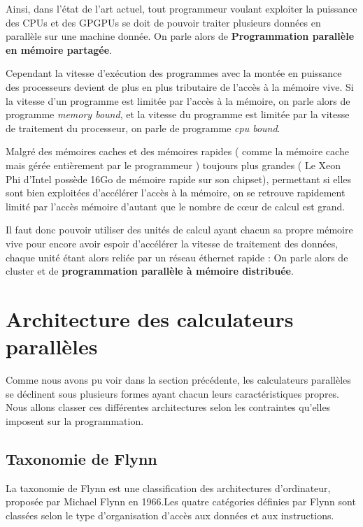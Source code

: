 \documentclass[fleqn,11pt]{article}
\begin{document}
Ainsi, dans l'état de l'art actuel, tout programmeur voulant exploiter la puissance des CPUs et des GPGPUs se doit de pouvoir traiter plusieurs données en parallèle sur une machine donnée. On parle alors de \textbf{Programmation parallèle en mémoire partagée}.

Cependant la vitesse d'exécution des programmes avec la montée en puissance des processeurs devient de plus en plus tributaire de l'accès à la mémoire vive. Si la vitesse d'un programme est limitée par l'accès à la mémoire,  on parle alors de programme \textsl{memory bound}, et la vitesse du programme est limitée par la vitesse de traitement du processeur, on parle de programme \textsl{cpu bound}.

Malgré des mémoires caches et des mémoires rapides ( comme la mémoire cache mais gérée entièrement par le programmeur )  toujours plus grandes ( Le Xeon Phi d'Intel possède 16Go de mémoire rapide sur son chipset), permettant si elles sont bien exploitées d'accélérer l'accès à la mémoire, on se retrouve rapidement limité par l'accès mémoire d'autant que le nombre de cœur de calcul est grand.

Il faut donc pouvoir utiliser des unités de calcul ayant chacun sa propre mémoire vive pour encore avoir espoir d'accélérer la vitesse de traitement des données, chaque unité étant alors reliée par un réseau éthernet rapide : On parle alors de cluster et de \textbf{programmation parallèle à mémoire distribuée}.

\section{Architecture des calculateurs parallèles}

Comme nous avons pu voir dans la section précédente, les calculateurs parallèles se déclinent sous plusieurs formes ayant chacun leurs caractéristiques propres. Nous allons classer ces différentes architectures selon les contraintes qu'elles imposent sur la programmation. 

\subsection{Taxonomie de Flynn}

La taxonomie de Flynn est une classification des architectures d'ordinateur, proposée par Michael Flynn en 1966.Les quatre catégories définies par Flynn sont classées selon le type d'organisation d'accès aux données et aux instructions.
\end{document}
